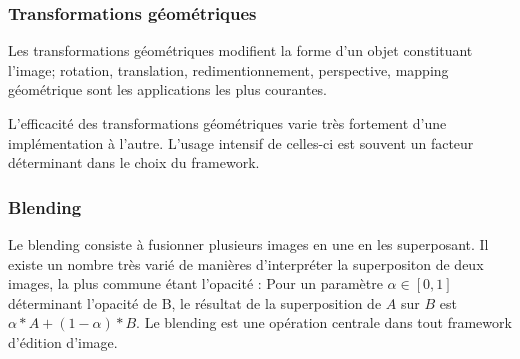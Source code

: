 			\subsubsection{Transformations géométriques}
				Les transformations géométriques modifient la forme d'un objet constituant l'image; rotation, translation, 
				redimentionnement, perspective, mapping géométrique sont les applications les plus courantes. 
				
				L'efficacité des transformations géométriques varie très fortement d'une implémentation à l'autre. L'usage
				intensif de celles-ci est souvent un facteur déterminant dans le choix du framework.
			\subsubsection{Blending}
				Le blending consiste à fusionner plusieurs images en une en les superposant. Il existe un nombre très varié
				de manières d'interpréter la superpositon de deux images, la plus commune étant l'opacité : Pour un paramètre
				$\alpha \in [0,1]$ déterminant l'opacité de B, le résultat de la superposition de $A$ sur $B$ est 
				$\alpha * A +  (1-\alpha) * B$. Le blending est une opération centrale dans tout framework d'édition d'image.

